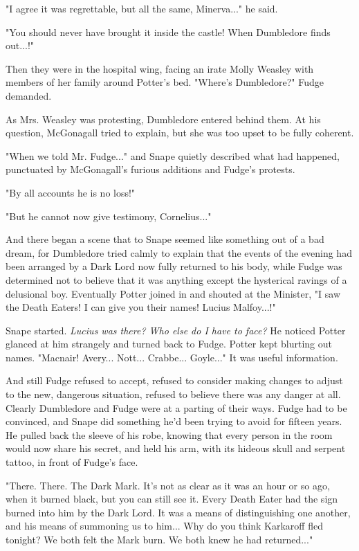 "I agree it was regrettable, but all the same, Minerva..." he said.

"You should never have brought it inside the castle! When Dumbledore finds out...!"

Then they were in the hospital wing, facing an irate Molly Weasley with members of her family around Potter's bed. "Where's Dumbledore?" Fudge demanded.

As Mrs. Weasley was protesting, Dumbledore entered behind them. At his question, McGonagall tried to explain, but she was too upset to be fully coherent.

"When we told Mr. Fudge..." and Snape quietly described what had happened, punctuated by McGonagall's furious additions and Fudge's protests.

"By all accounts he is no loss!"

"But he cannot now give testimony, Cornelius..."

And there began a scene that to Snape seemed like something out of a bad dream, for Dumbledore tried calmly to explain that the events of the evening had been arranged by a Dark Lord now fully returned to his body, while Fudge was determined not to believe that it was anything except the hysterical ravings of a delusional boy. Eventually Potter joined in and shouted at the Minister, "I saw the Death Eaters! I can give you their names! Lucius Malfoy...!"

Snape started. \emph{Lucius was there? Who else do I have to face?} He noticed Potter glanced at him strangely and turned back to Fudge. Potter kept blurting out names. "Macnair! Avery... Nott... Crabbe... Goyle..." It was useful information.

And still Fudge refused to accept, refused to consider making changes to adjust to the new, dangerous situation, refused to believe there was any danger at all. Clearly Dumbledore and Fudge were at a parting of their ways. Fudge had to be convinced, and Snape did something he'd been trying to avoid for fifteen years. He pulled back the sleeve of his robe, knowing that every person in the room would now share his secret, and held his arm, with its hideous skull and serpent tattoo, in front of Fudge's face.

"There. There. The Dark Mark. It's not as clear as it was an hour or so ago, when it burned black, but you can still see it. Every Death Eater had the sign burned into him by the Dark Lord. It was a means of distinguishing one another, and his means of summoning us to him... Why do you think Karkaroff fled tonight? We both felt the Mark burn. We both knew he had returned..."

